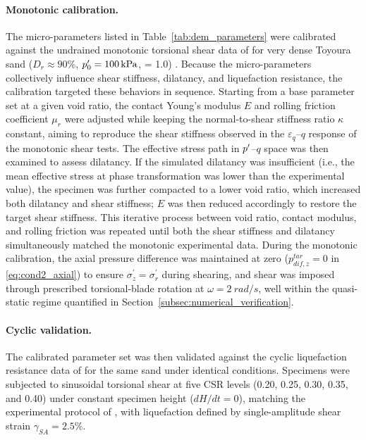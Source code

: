 \paragraph{Monotonic calibration.}
The micro-parameters listed in Table~\ref{tab:dem_parameters} were calibrated against the undrained monotonic torsional shear data of \citet{Nakata1998} for very dense Toyoura sand ($D_r \approx 90\%$, $p^\prime_0=\SI{100}{kPa}$, \Kzero{} = 1.0) \citep[see also][]{Ma2024}. Because the micro-parameters collectively influence shear stiffness, dilatancy, and liquefaction resistance, the calibration targeted these behaviors in sequence. Starting from a base parameter set at a given void ratio, the contact Young's modulus $E$ and rolling friction coefficient $\mu_r$ were adjusted while keeping the normal-to-shear stiffness ratio $\kappa$ constant, aiming to reproduce the shear stiffness observed in the $\varepsilon_q$--$q$ response of the monotonic shear tests. The effective stress path in $p^\prime$--$q$ space was then examined to assess dilatancy. If the simulated dilatancy was insufficient (i.e., the mean effective stress at phase transformation was lower than the experimental value), the specimen was further compacted to a lower void ratio, which increased both dilatancy and shear stiffness; $E$ was then reduced accordingly to restore the target shear stiffness. This iterative process between void ratio, contact modulus, and rolling friction was repeated until both the shear stiffness and dilatancy simultaneously matched the monotonic experimental data. During the monotonic calibration, the axial pressure difference was maintained at zero ($p_{dif,z}^{tar}=0$ in \cref{eq:cond2_axial}) to ensure $\sigma_z^{\prime}=\sigma_r^{\prime}$ during shearing, and shear was imposed through prescribed torsional-blade rotation at $\omega = \SI{2}{rad/s}$, well within the quasi-static regime quantified in Section~\ref{subsec:numerical_verification}.

\paragraph{Cyclic validation.}
The calibrated parameter set was then validated against the cyclic liquefaction resistance data of \citet{Ishihara1985} for the same sand under identical conditions. Specimens were subjected to sinusoidal torsional shear at five CSR levels (0.20, 0.25, 0.30, 0.35, and 0.40) under constant specimen height ($dH/dt=0$), matching the experimental protocol of \citet{Ishihara1985}, with liquefaction defined by single-amplitude shear strain $\gamma_{SA}=2.5\%$.

